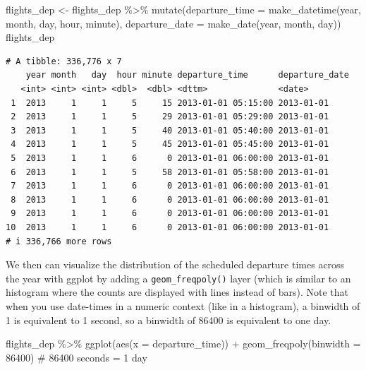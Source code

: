 \documentclass[
  letterpaper,
  DIV=11,
  numbers=noendperiod]{scrartcl}
\newenvironment{Shaded}{\begin{snugshade}}{\end{snugshade}}
\newcommand{\AttributeTok}[1]{\textcolor[rgb]{0.40,0.45,0.13}{#1}}
\newcommand{\CommentTok}[1]{\textcolor[rgb]{0.37,0.37,0.37}{#1}}
\newcommand{\DecValTok}[1]{\textcolor[rgb]{0.68,0.00,0.00}{#1}}
\newcommand{\FunctionTok}[1]{\textcolor[rgb]{0.28,0.35,0.67}{#1}}
\newcommand{\NormalTok}[1]{\textcolor[rgb]{0.00,0.23,0.31}{#1}}
\newcommand{\OtherTok}[1]{\textcolor[rgb]{0.00,0.23,0.31}{#1}}
\newcommand{\SpecialCharTok}[1]{\textcolor[rgb]{0.37,0.37,0.37}{#1}}
\begin{document}
\begin{Shaded}
\begin{Highlighting}[]
\NormalTok{flights\_dep }\OtherTok{\textless{}{-}}\NormalTok{ flights\_dep }\SpecialCharTok{\%\textgreater{}\%}
    \FunctionTok{mutate}\NormalTok{(}\AttributeTok{departure\_time =} \FunctionTok{make\_datetime}\NormalTok{(year, month, day, hour, minute),}
           \AttributeTok{departure\_date =} \FunctionTok{make\_date}\NormalTok{(year, month, day))}
\NormalTok{flights\_dep}
\end{Highlighting}
\end{Shaded}

\begin{verbatim}
# A tibble: 336,776 x 7
    year month   day  hour minute departure_time      departure_date
   <int> <int> <int> <dbl>  <dbl> <dttm>              <date>        
 1  2013     1     1     5     15 2013-01-01 05:15:00 2013-01-01    
 2  2013     1     1     5     29 2013-01-01 05:29:00 2013-01-01    
 3  2013     1     1     5     40 2013-01-01 05:40:00 2013-01-01    
 4  2013     1     1     5     45 2013-01-01 05:45:00 2013-01-01    
 5  2013     1     1     6      0 2013-01-01 06:00:00 2013-01-01    
 6  2013     1     1     5     58 2013-01-01 05:58:00 2013-01-01    
 7  2013     1     1     6      0 2013-01-01 06:00:00 2013-01-01    
 8  2013     1     1     6      0 2013-01-01 06:00:00 2013-01-01    
 9  2013     1     1     6      0 2013-01-01 06:00:00 2013-01-01    
10  2013     1     1     6      0 2013-01-01 06:00:00 2013-01-01    
# i 336,766 more rows
\end{verbatim}

We then can visualize the distribution of the scheduled departure times
across the year with ggplot by adding a \texttt{geom\_freqpoly()} layer
(which is similar to an histogram where the counts are displayed with
lines instead of bars). Note that when you use date-times in a numeric
context (like in a histogram), a binwidth of 1 is equivalent to 1
second, so a binwidth of 86400 is equivalent to one day.

\begin{Shaded}
\begin{Highlighting}[]
\NormalTok{flights\_dep }\SpecialCharTok{\%\textgreater{}\%}
  \FunctionTok{ggplot}\NormalTok{(}\FunctionTok{aes}\NormalTok{(}\AttributeTok{x =}\NormalTok{ departure\_time)) }\SpecialCharTok{+}
  \FunctionTok{geom\_freqpoly}\NormalTok{(}\AttributeTok{binwidth =} \DecValTok{86400}\NormalTok{) }\CommentTok{\# 86400 seconds = 1 day}
\end{Highlighting}
\end{Shaded}
\end{document}
